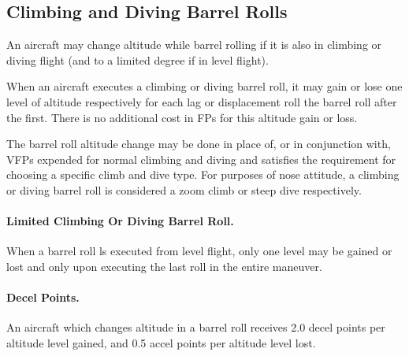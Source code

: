 \begin{advancedrules}

\section{Climbing and Diving Barrel Rolls}

An aircraft may change altitude while barrel rolling if it is also in climbing or diving flight (and to a limited degree if in level flight).

When an aircraft executes a climbing or diving barrel roll, it may gain or lose one level of altitude respectively for each lag or displacement roll  the barrel roll after the first. There is no additional cost in FPs for this altitude gain or loss.

The barrel roll altitude change may be done in place of, or in conjunction with, VFPs expended for normal climbing and diving and satisfies the requirement for choosing a specific climb and dive type. For purposes of nose attitude, a climbing or diving barrel roll is considered a zoom climb or steep dive respectively.


\paragraph{Limited Climbing Or Diving Barrel Roll.} When a barrel roll ls executed from level flight, only one level may be gained or lost and only upon executing the last roll in the entire maneuver.

\paragraph{Decel Points.} An aircraft which changes altitude in a barrel roll receives 2.0 decel points per altitude level gained, and 0.5 accel points per altitude level lost.

\end{advancedrules}
